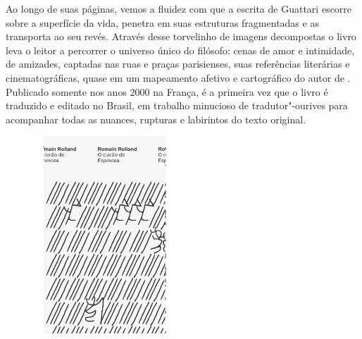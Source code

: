 Ao longo de suas páginas, vemos a fluidez com que a escrita de Guattari escorre sobre a superfície da vida, penetra em suas estruturas fragmentadas e as transporta ao seu revés. Através desse torvelinho de imagens decompostas o livro leva o leitor a percorrer o universo único do filósofo: cenas de amor e intimidade, de amizades, captadas nas ruas e praças parisienses, suas referências literárias e cinematográficas, quase em um mapeamento afetivo e cartográfico do autor de {}. Publicado somente nos anos 2000 na França, é a primeira vez que o livro é traduzido e editado no Brasil, em trabalho minucioso de tradutor"-ourives para acompanhar todas as nuances, rupturas e labirintos do texto original.

\vfill

\hspace*{-.4cm}\begin{minipage}[c]{.5\linewidth}
\small{
{}}
\end{minipage}

\pagebreak


\begin{center}
\hspace*{-3.6cm}
\hspace*{3.1cm}\includegraphics[width=74mm]{./grid/rolland.png}
\end{center}

